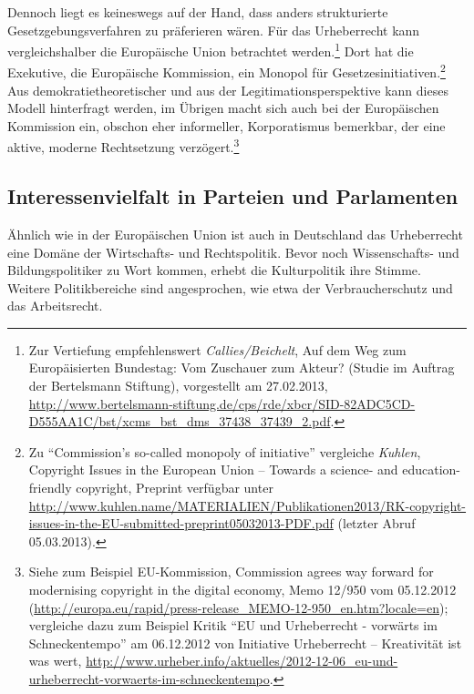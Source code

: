 \documentclass[output=paper]{langscibook}
\begin{document}
Dennoch liegt es keineswegs auf der Hand, dass anders strukturierte
Gesetzgebungsverfahren zu präferieren wären. Für das Urheberrecht kann
vergleichshalber die Europäische Union betrachtet werden.\footnote{Zur
  Vertiefung empfehlenswert \emph{Callies/Beichelt}, Auf dem Weg zum
  Europäisierten Bundestag: Vom Zuschauer zum Akteur? (Studie im Auftrag
  der Bertelsmann Stiftung), vorgestellt am 27.02.2013,
  \url{http://www.bertelsmann-stiftung.de/cps/rde/xbcr/SID-82ADC5CD-D555AA1C/bst/xcms_bst_dms_37438_37439_2.pdf}.}
Dort hat die Exekutive, die Europäische Kommission, ein Monopol für
Gesetzesinitiativen.\footnote{Zu \enquote{Commission's so-called
  monopoly of initiative} vergleiche \emph{Kuhlen}, Copyright Issues in the
  European Union -- Towards a science- and education-friendly copyright,
  Preprint verfügbar unter
  \url{http://www.kuhlen.name/MATERIALIEN/Publikationen2013/RK-copyright-issues-in-the-EU-submitted-preprint05032013-PDF.pdf}
  (letzter Abruf 05.03.2013).} Aus demokratietheoretischer und aus der
Legitimationsperspektive kann dieses Modell hinterfragt werden, im
Übrigen macht sich auch bei der Europäischen Kommission ein, obschon
eher informeller, Korporatismus bemerkbar, der eine aktive, moderne
Rechtsetzung verzögert.\footnote{Siehe zum Beispiel EU-Kommission, Commission
  agrees way forward for modernising copyright in the digital economy,
  Memo 12/950 vom 05.12.2012
  (\url{http://europa.eu/rapid/press-release_MEMO-12-950_en.htm?locale=en});
  vergleiche dazu zum Beispiel Kritik \enquote{EU und Urheberrecht - vorwärts im
  Schneckentempo} am 06.12.2012 von Initiative Urheberrecht --
  Kreativität ist was wert,
  \url{http://www.urheber.info/aktuelles/2012-12-06_eu-und-urheberrecht-vorwaerts-im-schneckentempo}.}

\hypertarget{interessenvielfalt-in-parteien-und-parlamenten}{%
\subsection{Interessenvielfalt in Parteien und
Parlamenten}\label{interessenvielfalt-in-parteien-und-parlamenten}}

Ähnlich wie in der Europäischen Union ist auch in Deutschland das
Urheberrecht eine Domäne der Wirtschafts- und Rechtspolitik. Bevor noch
Wissenschafts- und Bildungspolitiker zu Wort kommen, erhebt die
Kulturpolitik ihre Stimme. Weitere Politikbereiche sind angesprochen,
wie etwa der Verbraucherschutz und das Arbeitsrecht.
\end{document}
